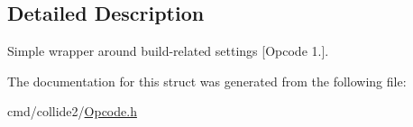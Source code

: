 \subsection{Detailed Description}
Simple wrapper around build-\/related settings \mbox{[}Opcode 1.\mbox{]}. 

The documentation for this struct was generated from the following file\+:\begin{DoxyCompactItemize}
\item 
cmd/collide2/\hyperlink{Opcode_8h}{Opcode.\+h}\end{DoxyCompactItemize}
